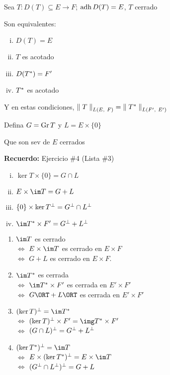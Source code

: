 
\renewcommand{\catnum}{11 (9 No Presencial)}%
\renewcommand{\fecha}{21 de abril de 2020}


\begin{thm}\label{thm:caract-op-acot}
Sea $T: D(T) \subseteq E \to F$; $\adh D(T) = E$, $T$ cerrado

Son equivalentes:
\begin{enumerate}[(i)]
    \item $D(T) = E$
    \item $T$ es acotado
    \item $D(T\adj) = F'$
    \item $T\adj$ es acotado
\end{enumerate}
Y en estas condiciones, $\norm[L(E,\ F)]{T} = \norm[L(F',\ E')]{T\adj}$ %
\end{thm}

Defina $G = \gr T$ y $L = E \times \{ 0\}$

Que son sev de $E$ cerrados

\textbf{Recuerdo:} Ejercicio \#4 (Lista \#3)

\begin{enumerate}[(i)]
    \item $\ker T \times \{ 0\} = G \cap L$
    \item $E \times \im T = G + L$
    \item $\{ 0 \} \times \ker T\ort = G\ort \cap L\ort$
    \item $\im T\adj \times F' = G\ort + L\ort$
\end{enumerate}

\begin{enumerate}
    \item $\im T $ es cerrado  \\ 
    $\iff $ $E\times \im T$ es cerrado en $E \times F$ \\
    $\iff$ $G + L$ es cerrado en $E \times F$.
    \item $\im T\adj$ es cerrada \\
    $\iff$ $\im T\adj \times F'$ es cerrada en $E' \times F'$ \\
    $\iff$ $G\ORT + L\ORT$ es cerrada en $E' \times F'$ 
    \item $(\ker T )\ort = \im T\adj$ \\
    $\iff$ $(\ker T)\ort \times F' = \img T\adj \times F'$ \\ 
    $\iff$ $(G \cap L)\ort = G\ort + L\ort$
    \item $(\ker T\adj)\ort = \im T$ \\
    $\iff$ $E \times (\ker T \adj) \ort = E \times \im T$ \\
    $\iff$ $(G\ort \cap L\ort) \ort = G + L$
\end{enumerate}

